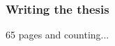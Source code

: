 \documentclass{beamer}
\begin{document}

	\begin{frame}
		\frametitle{Writing the thesis}
		65 pages and counting...
	\end{frame}
	
\end{document}
